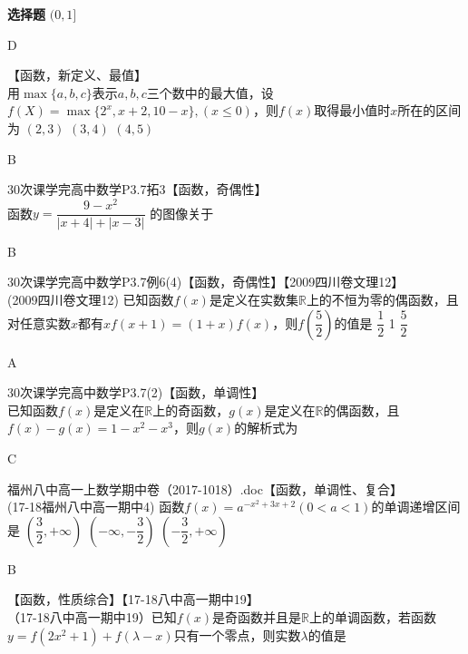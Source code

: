 \begin{exercise}{\bf 选择题}
        {$(0,1]$}
      \begin{answer}
        D
      \end{answer}
    \item 【函数，新定义、最值】\\
      用$\max\{a,b,c\}$表示$a,b,c$三个数中的最大值，设$f(X)=\max\{2^x,x+2,10-x\},(x\leq 0)$，则$f(x)$取得最小值时$x$所在的区间为\xz
        {$(2,3)$}
        {$(3,4)$}
        {$(4,5)$}
      \begin{answer}
        B
      \end{answer}
    \item 30次课学完高中数学P3.7拓3【函数，奇偶性】\\
      函数$y=\dfrac{9-x^2}{|x+4|+|x-3|}$ 的图像关于\xz
      \begin{answer}
        B
      \end{answer}
    \item 30次课学完高中数学P3.7例6(4)【函数，奇偶性】【2009四川卷文理12】\\
      (2009四川卷文理12) 已知函数$f(x)$是定义在实数集$\mathbb{R}$上的不恒为零的偶函数，且对任意实数$x$都有$xf(x+1)=(1+x)f(x) $，则$f(\dfrac{5}{2}) $的值是\xz
       {$\dfrac12$}
       {1}
       {$\dfrac52$}
      \begin{answer}
        A
      \end{answer}
    \item 30次课学完高中数学P3.7(2)【函数，单调性】\\
      已知函数$f(x)$是定义在$\mathbb{R}$上的奇函数，$g(x)$是定义在$\mathbb{R} $的偶函数，且$f(x)-g(x)=1-x^2-x^3 $，则$g(x) $的解析式为\xz
      \begin{answer}
        C
      \end{answer}
    \item 福州八中高一上数学期中卷（2017-1018）.doc【函数，单调性、复合】\\
      (17-18福州八中高一期中4)
      函数$f(x)=a^{-x^2+3x+2}(0<a<1)$的单调递增区间是\xz
        {$(\dfrac32,+\infty)$}
        {$(-\infty,-\dfrac32)$}
        {$(-\dfrac32,+\infty)$}
      \begin{answer}
        B
      \end{answer}
    \item 【函数，性质综合】【17-18八中高一期中19】\\
      （17-18八中高一期中19）已知$f(x)$是奇函数并且是$\mathbb{R}$上的单调函数，若函数$y=f(2x^2+1)+f(\lambda-x) $只有一个零点，则实数$\lambda $的值是\xz

\end{exercise}

